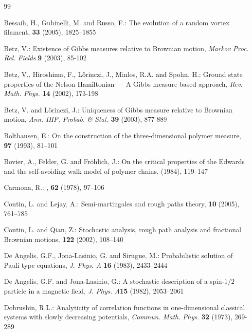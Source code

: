 \documentclass[a4paper,11pt]{article}
\begin{document}
\begin{thebibliography}{99}

Bessaih, H., Gubinelli, M. and Russo, F.:
\newblock The evolution of a random vortex filament,
 {\bf 33} (2005), 1825--1855 


Betz, V.: Existence of Gibbs measures relative to Brownian motion,
{\it Markov Proc. Rel. Fields} {\bf 9} (2003), 85-102 

Betz, V., Hiroshima, F., L\H{o}rinczi, J., Minlos, R.A. and 
Spohn, H.: Ground state properties of the Nelson Hamiltonian 
--- A Gibbs measure-based approach, {\em Rev. Math. Phys.} 
{\bf 14} (2002), 173-198 

Betz, V. and L\H{o}rinczi, J.: Uniqueness of Gibbs measure relative
to Brownian motion, {\it Ann. IHP, Probab. \& Stat.} 
{\bf 39} (2003), 877-889

Bolthausen, E.: 
\newblock On the construction of the three-dimensional polymer measure,
 {\bf 97} (1993), 81--101

Bovier, A., Felder, G. and Fr{\"o}hlich, J.:
\newblock On the critical properties of the {E}dwards and 
the self-avoiding walk model of polymer chains,
 (1984), 119--147

Carmona, R.:
,
 {\bf 62} (1978), 97--106

Coutin, L. and Lejay, A.:
\newblock Semi-martingales and rough paths theory,
 {\bf 10} (2005), 761--785 

Coutin, L. and Qian, Z.:
\newblock Stochastic analysis, rough path analysis and fractional 
{B}rownian motions,
 {\bf 122} (2002), 108--140 

De Angelis, G.F., Jona-Lasinio, G. and Sirugue, M.: Probabilistic 
solution of {P}auli type equations, {\em J. Phys. A} {\bf 16} 
(1983), {2433--2444}
             
De Angelis, G.F. and Jona-Lasinio, G.: A stochastic description of a 
spin-$1/2$ particle in a magnetic field, {\it J. Phys. A}{\bf 15} 
(1982), 2053--2061

Dobrushin, R.L.: Analyticity of correlation functions in
one-dimensional classical systems with slowly decreasing potentials,
{\em Commun. Math. Phys.} {\bf 32}  (1973), 269-289


\end{thebibliography}
\end{document}
